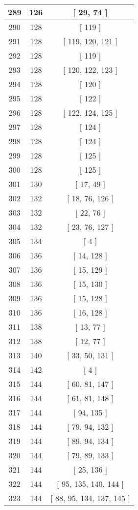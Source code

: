 \begin{center}
\begin{longtable}[H]{|| c c c ||}
\hline
289 & 126 & [ 29, 74 ] \\ 
\hline
290 & 128 & [ 119 ] \\ 
\hline
291 & 128 & [ 119, 120, 121 ] \\ 
\hline
292 & 128 & [ 119 ] \\ 
\hline
293 & 128 & [ 120, 122, 123 ] \\ 
\hline
294 & 128 & [ 120 ] \\ 
\hline
295 & 128 & [ 122 ] \\ 
\hline
296 & 128 & [ 122, 124, 125 ] \\ 
\hline
297 & 128 & [ 124 ] \\ 
\hline
298 & 128 & [ 124 ] \\ 
\hline
299 & 128 & [ 125 ] \\ 
\hline
300 & 128 & [ 125 ] \\ 
\hline
301 & 130 & [ 17, 49 ] \\ 
\hline
302 & 132 & [ 18, 76, 126 ] \\ 
\hline
303 & 132 & [ 22, 76 ] \\ 
\hline
304 & 132 & [ 23, 76, 127 ] \\ 
\hline
305 & 134 & [ 4 ] \\ 
\hline
306 & 136 & [ 14, 128 ] \\ 
\hline
307 & 136 & [ 15, 129 ] \\ 
\hline
308 & 136 & [ 15, 130 ] \\ 
\hline
309 & 136 & [ 15, 128 ] \\ 
\hline
310 & 136 & [ 16, 128 ] \\ 
\hline
311 & 138 & [ 13, 77 ] \\ 
\hline
312 & 138 & [ 12, 77 ] \\ 
\hline
313 & 140 & [ 33, 50, 131 ] \\ 
\hline
314 & 142 & [ 4 ] \\ 
\hline
315 & 144 & [ 60, 81, 147 ] \\ 
\hline
316 & 144 & [ 61, 81, 148 ] \\ 
\hline
317 & 144 & [ 94, 135 ] \\ 
\hline
318 & 144 & [ 79, 94, 132 ] \\ 
\hline
319 & 144 & [ 89, 94, 134 ] \\ 
\hline
320 & 144 & [ 79, 89, 133 ] \\ 
\hline
321 & 144 & [ 25, 136 ] \\ 
\hline
322 & 144 & [ 95, 135, 140, 144 ] \\ 
\hline
323 & 144 & [ 88, 95, 134, 137, 145 ] \\ 

\end{longtable}
\end{center}
